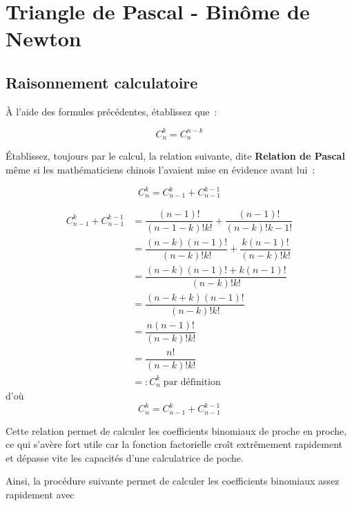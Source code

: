 \documentclass[french]{book}
\newcommand{\co}[2]{C_#2^#1}
\begin{document}
\section{Triangle de Pascal - Binôme de Newton}

\subsection{Raisonnement calculatoire}

À l'aide des formules précédentes, établissez que~:


\begin{prop}[Symétrie]
$$\co{k}{n}=\co{{n-k}}{n}$$
\end{prop}


\'Etablissez, toujours par le calcul, la relation suivante, dite \textbf{Relation de Pascal} même si les mathématiciens chinois l'avaient
mise en évidence avant lui~:


\begin{prop}
   $$\co{k}{n}=\co{{k}}{{n-1}}+\co{{k-1}}{{n-1}}$$
\end{prop}

\begin{demo}
\begin{align*}
\co{{k}}{{n-1}}+\co{{k-1}}{{n-1}} &=\dfrac{(n-1)!}{(n-1-k)!k!}+\dfrac{(n-1)!}{(n-k)!k-1!}\\
& = \dfrac{(n-k)(n-1)!}{(n-k)!k!}+\dfrac{k(n-1)!}{(n-k)!k!} \\
& = \dfrac{(n-k)(n-1)! + k(n-1)!}{(n-k)!k!} \\
& = \dfrac{(n-k + k)(n-1)!}{(n-k)!k!} \\
& =\dfrac{n(n-1)!}{(n-k)!k!} \\
& =\dfrac{n!}{(n-k)!k!}\\
 & =:\co{k}{n} \; \text{par définition}
\end{align*}
d'où 
$$\co{k}{n}=\co{{k}}{{n-1}}+\co{{k-1}}{{n-1}}$$

\end{demo}



Cette relation permet de calculer les coefficients binomiaux de proche en proche, ce qui s'avère fort utile car la fonction factorielle
croît extrêmement rapidement et dépasse vite les capacités d'une calculatrice de poche.

Ainsi, la procédure suivante permet de calculer les coefficients binomiaux assez rapidement avec

\end{document}
